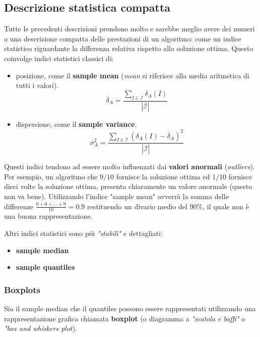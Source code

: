 \documentclass{article}
\newcommand{\ovcal}[1]{\overline{\mathcal{#1}}}
\begin{document}
\subsection{Descrizione statistica compatta}
Tutte le precedenti descrizioni prendono molto e sarebbe meglio avere dei numeri o una descrizione
compatta delle prestazioni di un algoritmo: come un indice statistico riguardante la differenza
relativa rispetto alla soluzione ottima. Questo coinvolge indici statistici classici di:
\begin{itemize}
    \item posizione, come il \textbf{sample mean} (\textit{mean} si riferisce alla media aritmetica di tutti
          i valori).
          $$\overline{\delta}_A = \frac{\sum_{I\in\ovcal{I}}\delta_A (I)}{|\ovcal{I}|}$$
    \item dispersione, come il \textbf{sample variance}.
          $$\overline{\sigma}^2_A = \frac{\sum_{I\in\ovcal{I}}(\delta_A(I)-\overline{\delta}_A)^2}{|\ovcal{I}|}$$

\end{itemize}
Questi indici tendono ad essere molto influenzati dai \textbf{valori anormali} (\textit{outliers}). Per
esempio, un algoritmo che $9/10$ fornisce la soluzione ottima ed $1/10$ fornisce dieci volte la
soluzione ottima, presenta chiaramente un valore anormale (questo non va bene). Utilizzando l'indice
"sample mean" avverrà la somma delle differenze $\frac{0+0+...+9}{10}=0.9$ restituendo un divario
medio del $90\%$, il quale non è una buona rappresentazione.

Altri indici statistici sono più \textit{"stabili"} e dettagliati:
\begin{itemize}
    \item \textbf{sample median}
    \item \textbf{sample quantiles}
\end{itemize}

\subsubsection{Boxplots}
Sia il sample median che il quantiles possono essere rappresentati utilizzando una rappresentazione
grafica chiamata \textbf{boxplot} (o diagramma a \textit{"scatola e baffi"} o \textit{"box and whiskers plot}).
\end{document}

